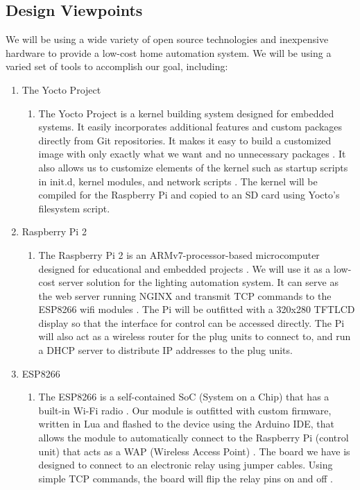 \subsection{Design Viewpoints}

We will be using a wide variety of open source technologies and inexpensive
hardware to provide a low-cost home automation system. We will be using a
varied set of tools to accomplish our goal, including:

\begin{enumerate}
    \item The Yocto Project 
    \begin{enumerate}
        \item The Yocto Project is a kernel building system designed for
            embedded systems. It easily incorporates additional features and
            custom packages directly from Git repositories. It makes it easy to
            build a customized image with only exactly what we want and no
            unnecessary packages \cite{yocto}. It also allows us to customize
            elements of the kernel such as startup scripts in init.d, kernel
            modules, and network scripts \cite{flask}. The kernel will be
            compiled for the Raspberry Pi and copied to an SD card using
            Yocto's filesystem script.
    \end{enumerate} 
        \item Raspberry Pi 2
    \begin{enumerate}
        \item The Raspberry Pi 2 is an ARMv7-processor-based microcomputer
            designed for educational and embedded projects \cite{raspi}. We
            will use it as a low-cost server solution for the lighting
            automation system. It can serve as the web server running NGINX and
            transmit TCP commands to the ESP8266 wifi modules \cite{nginx}. The
            Pi will be outfitted with a 320x280 TFTLCD display \cite{tftlcd} so
            that the interface for control can be accessed directly.  The Pi
            will also act as a wireless router for the plug units to connect
            to, and run a DHCP server to distribute IP addresses to the plug
            units.
    \end{enumerate} 
        \item ESP8266
    \begin{enumerate}
        \item The ESP8266 is a self-contained SoC (System on a Chip) that has a
            built-in Wi-Fi radio \cite{esp8266}. Our module is outfitted with
            custom firmware, written in Lua and flashed to the device using the
            Arduino IDE, that allows the module to automatically connect to the
            Raspberry Pi (control unit) that acts as a WAP (Wireless Access
            Point) \cite{lua}. The board we have is designed to connect to an
            electronic relay using jumper cables. Using simple TCP commands,
            the board will flip the relay pins on and off \cite{relay}.
    \end{enumerate}
\end{enumerate}

